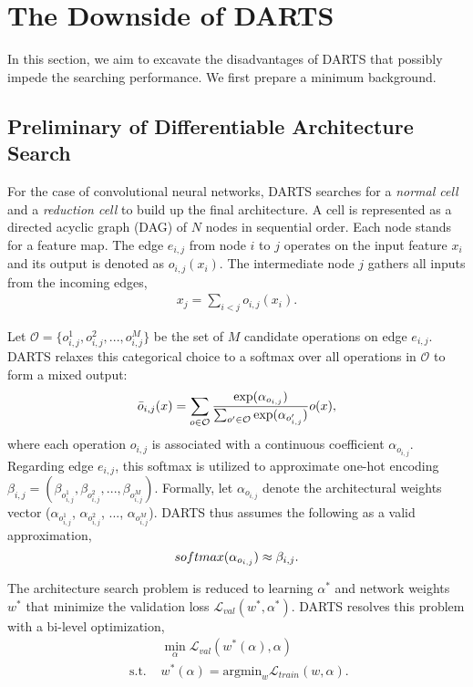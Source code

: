 \documentclass[runningheads]{llncs}
\begin{document}
\section{The Downside of DARTS}
In this section, we aim to excavate the disadvantages of DARTS that possibly impede the searching performance. We first prepare a minimum background.

\subsection{Preliminary of Differentiable Architecture Search}
For the case of convolutional neural networks, DARTS \cite{liu2018darts} searches for a \emph{normal cell} and a \emph{reduction cell} to build up the final architecture. A cell is represented as a directed acyclic graph (DAG) of $N$ nodes in sequential order.  Each node stands for a feature map. The edge $e_{i,j}$ from node $i$ to $j$ operates on the input feature $x_i$ and its output is denoted as $o_{i,j}(x_i)$. The intermediate node $j$ gathers all inputs from the incoming edges,
\begin{align}
x_j = \sum_{i<j} o_{i, j} (x_i).
\end{align}

Let $\mathcal{O} = \{o_{i,j}^1, o_{i,j}^2, ..., o_{i,j}^M\}$ be the set of $M$ candidate operations on edge $e_{i,j}$. DARTS relaxes this categorical choice to a softmax  over all operations in $\mathcal{O}$ to form a mixed output:
\begin{align}{\label{eq:cifar_sum}}
\bar{o}_{i, j} (x) = \sum_{o \in \mathcal{O}} \frac{\exp(\alpha_{o_{i,j}})}{\sum_{o' \in \mathcal{O}} \exp(\alpha_{o'_{i,j}})} o(x),
\end{align}
where each operation $o_{i,j}$ is associated with a continuous coefficient $\alpha_{o_{i,j}}$. Regarding edge $e_{i,j}$, this softmax is utilized to approximate one-hot encoding $\beta_{i,j} = (\beta_{o_{i,j}^1}, \beta_{o_{i,j}^2}, ..., \beta_{o_{i,j}^M} )$. Formally, let $\alpha_{o_{i,j}}$ denote the architectural weights vector ($\alpha_{o_{i,j}^1}$, $\alpha_{o_{i,j}^2}$, ..., $\alpha_{o_{i,j}^M}$). DARTS thus assumes the following as a valid approximation,
\begin{equation}{\label{eq:softmax approx}}
	softmax(\alpha_{o_{i,j}})\approx \beta_{i,j}.
\end{equation}

The architecture search problem is reduced to learning $\alpha^*$ and network weights $w^*$ that minimize the validation loss $\mathcal{L}_{val} (w^*, \alpha^*)$. DARTS resolves this problem with a bi-level optimization, 
\begin{equation}\label{eq:darts-bi-level-opt}
\begin{split}
&\min_{\alpha} \mathcal{L}_{val} (w^*(\alpha), \alpha) \\
\text{ s.t. } &w^*(\alpha) = \text{argmin}_w  \mathcal{L}_{train} (w, \alpha).
\end{split}
\end{equation}
\end{document}
